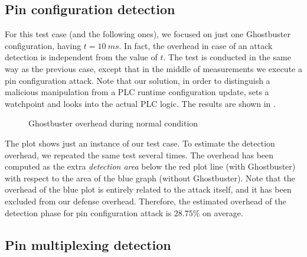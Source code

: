 \subsection{Pin configuration detection}

For this test case (and the following ones), we focused on just one Ghostbuster configuration, having $t = \SI{10}{ms}$.
In fact, the overhead in case of an attack detection is independent from the value of $t$.
The test is conducted in the same way as the previous case, except that in the middle of measurements we execute a pin configuration attack.
Note that our solution, in order to distinguish a malicious manipulation from a PLC runtime configuration update, sets a watchpoint and looks into the actual PLC logic.
The results are shown in .
\begin{figure}[h]
\centering
{}
\caption{Ghostbuster overhead during normal condition}
\label{fig:pinconf-overhead}
\end{figure}
The plot shows just an instance of our test case. To estimate the detection overhead, we repeated the same test several times.
The overhead has been computed as the extra \emph{detection area} below the red plot line (with Ghostbuster) with respect to the area of the blue graph (without Ghostbuster).
Note that the overhead of the blue plot is entirely related to the attack itself, and it has been excluded from our defense overhead.
Therefore, the estimated overhead of the detection phase for pin configuration attack is $28.75\%$ on average.


\subsection{Pin multiplexing detection}

